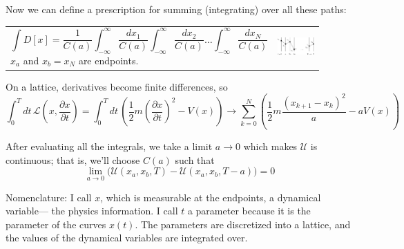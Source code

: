\documentclass[12pt]{article}
\begin{document}
Now we can define a prescription for summing (integrating) over all
these paths:
\begin{center}
  \begin{tabular}{p{0.55\linewidth} p{0.35\linewidth}}
    \begin{minipage}{\linewidth}
      \[ \int D[x] = \frac{1}{C(a)} \int_{-\infty}^\infty \frac{dx_1}{C(a)} \int_{-\infty}^\infty
      \frac{dx_2}{C(a)} \ldots \int_{-\infty}^\infty
      \frac{dx_N}{C(a)} \]
      $x_a$ and $x_b = x_N$ are endpoints.
    \end{minipage} &
    \begin{minipage}{\linewidth}
      \includegraphics[width=\linewidth]{fig3.eps}
    \end{minipage}
  \end{tabular}
\end{center}

On a lattice, derivatives become finite differences, so
\begin{equation}
  \int_0^T dt \, \mathcal{L}(x, \frac{\partial x}{\partial t}) =
  \int_0^T dt \, \left( \frac{1}{2} m \left(\frac{\partial x}{\partial t} \right)^2 - V(x)
  \right) \to
  \sum_{k=0}^N \left( \frac{1}{2} m \frac{(x_{k+1} - x_k)^2}{a} - a
  V(x) \right)
\end{equation}

After evaluating all the integrals, we take a limit $a \to 0$ which
makes $\mathcal{U}$ is continuous; that is, we'll choose $C(a)$ such
that
\begin{equation}
  \lim_{a \to 0} \bigg( \mathcal{U}(x_a, x_b, T) - \mathcal{U}(x_a,
  x_b, T - a) \bigg) = 0
\end{equation}

Nomenclature: I call $x$, which is measurable at the endpoints, a
dynamical variable--- the physics information.  I call $t$ a parameter
because it is the parameter of the curves $x(t)$.  The parameters are
discretized into a lattice, and the values of the dynamical variables
are integrated over.
\end{document}
